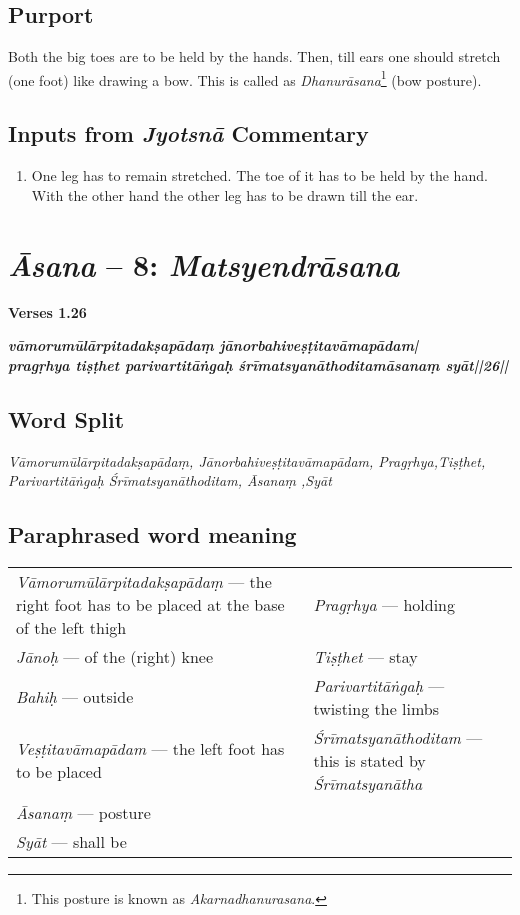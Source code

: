 \subsection*{Purport}

Both the big toes are to be held by the hands. Then, till ears one should stretch (one foot)  like drawing a bow. This is called as \textit{Dhanurāsana}\footnote{This posture is known as \textit{Akarnadhanurasana}.} (bow posture).

\subsection*{Inputs from \textit{Jyotsnā} Commentary}

\begin{enumerate}
\item One leg has to remain stretched. The toe of it has to be held by the hand.  With the other hand the other leg has to be drawn till the ear. 
\end{enumerate}

\section*{\textit{Āsana} -- 8: \textit{Matsyendrāsana}}

\noindent \textbf{Verses 1.26}

\begin{shloka}
\textit{\textbf{vāmorumūlārpitadakṣapādaṃ jānorbahiveṣṭitavāmapādam|}\\
\textbf{pragṛhya tiṣṭhet parivartitāṅgaḥ śrīmatsyanāthoditamāsanaṃ syāt||26||}}
\end{shloka}
\vspace{-10pt}

\subsection*{Word Split}

\textit{Vāmorumūlārpitadakṣapādaṃ, Jānorbahiveṣṭitavāmapādam, Pragṛhya,\break Tiṣṭhet, Parivartitāṅgaḥ Śrīmatsyanāthoditam, Āsanaṃ ,Syāt}

\subsection*{Paraphrased word meaning}
\vspace{-10pt}

\begin{longtable}{>{\noindent\raggedright}p{5cm}>{\noindent\raggedright}p{5cm}}
\textit{Vāmorumūlārpitadakṣapādaṃ} --- the right foot has to be placed at the base of the left thigh  & \textit{Pragṛhya} --- holding \tabularnewline
\textit{Jānoḥ} --- of the (right) knee & \textit{Tiṣṭhet} --- stay\tabularnewline
\textit{Bahiḥ} --- outside  & \textit{Parivartitāṅgaḥ} --- twisting the limbs\tabularnewline
\textit{Veṣṭitavāmapādam} --- the left foot has to be placed  & \textit{Śrīmatsyanāthoditam} --- this is stated by \textit{Śrīmatsyanātha}\tabularnewline
\textit{Āsanaṃ} --- posture & \tabularnewline
\textit{Syāt} --- shall be & 
\end{longtable}
\vspace{-5pt}

